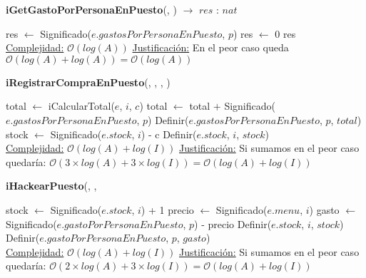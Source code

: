 \begin{Algoritmos}
    \begin{algorithm}
    \caption{\textbf{iGetGastoPorPersonaEnPuesto}(, ) $\to$ $res$ : $nat$}
    \begin{algorithmic}
      
        \State res $\gets$ Significado($e.gastosPorPersonaEnPuesto$, $p$)  
    \Else
        \State res $\gets$ 0  
    \EndIf
    \State \Return res
    \\
    \Statex \underline{Complejidad:} $\mathcal{O}(log(A))$
    \Statex \underline{Justificación:} En el peor caso queda $\mathcal{O}(log(A) + log(A)) = \mathcal{O}(log(A))$
    \end{algorithmic}
    \end{algorithm}

    \begin{algorithm}
    \caption{\textbf{iRegistrarCompraEnPuesto}(, , , )}
    \begin{algorithmic}
    \State total $\gets$ iCalcularTotal($e$, $i$, $c$)  
      
        \State total $\gets$ total $+$ Significado($e.gastosPorPersonaEnPuesto$, $p$) 
    \EndIf
    \State Definir($e.gastosPorPersonaEnPuesto$, $p$, $total$)  
    \State stock $\gets$ Significado($e.stock$, $i$) - c  
    \State Definir($e.stock$, $i$, $stock$)  
    \\
    \Statex \underline{Complejidad:} $\mathcal{O}(log(A)+log(I))$
    \Statex \underline{Justificación:} Si sumamos en el peor caso quedaría: $\mathcal{O}(3 \times log(A)+3 \times log(I)) = \mathcal{O}(log(A)+log(I))$
    \end{algorithmic}
    \end{algorithm}

    \begin{algorithm}
    \caption{\textbf{iHackearPuesto}(, , }
    \begin{algorithmic}
    \State stock $\gets$ Significado($e.stock$, $i$) + 1 
    \State precio $\gets$ Significado($e.menu$, $i$)  
    \State gasto $\gets$ Significado($e.gastoPorPersonaEnPuesto$, $p$) - precio  
    \State Definir($e.stock$, $i$, $stock$)  
    \State Definir($e.gastoPorPersonaEnPuesto$, $p$, $gasto$)  
    \\
    \Statex \underline{Complejidad:} $\mathcal{O}(log(A)+log(I))$
    \Statex \underline{Justificación:} Si sumamos en el peor caso quedaría: $\mathcal{O}(2 \times log(A)+3 \times log(I)) = \mathcal{O}(log(A)+log(I))$
    \end{algorithmic}
    \end{algorithm}
\end{Algoritmos}
